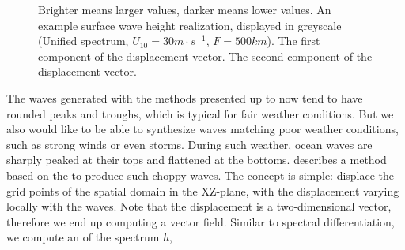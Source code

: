 \begin{figure}
{ }
 \hfill
\caption{
Brighter means larger values, darker means lower values.
 An example surface wave height
realization, displayed in greyscale (Unified spectrum, $U_{10}=30m\cdot s^{-1}$, $F=500km$).
 The first component of the displacement vector.
 The second component of the displacement vector.
}
\label{fig:displacements}
\end{figure}
%
The waves generated with the methods presented up to now tend to have rounded peaks and troughs,
which is typical for fair weather conditions. But we also would like to be able to synthesize waves
matching poor weather conditions, such as strong winds or even storms. During such weather, ocean waves
are sharply peaked at their tops and flattened at the bottoms. \citet{course:simulatingocean}
describes a method based on the \FourierTransform to produce such choppy waves. The concept is simple: displace
the grid points of the spatial domain in the XZ-plane, with the displacement varying locally with the waves.
Note that the displacement is a two-dimensional vector, therefore we end up computing a vector field.
Similar to spectral differentiation, we compute an \InvFourierTransform of the spectrum $h$,
